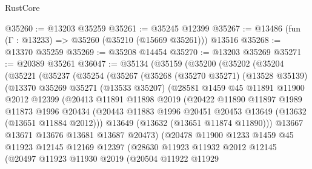 \begin{lexlean}{RustCore}
\begin{coremodule}
@35260 := @13203 @35259
@35261 := @35245 @12399
@35267 := @13486 (fun (Γ : @13233) => @35260 (@35210 (@15669 @35261))) @13516
@35268 := @13370 @35259
@35269 := @35208 @14454
@35270 := @13203 @35269
@35271 := @20389 @35261
@36047 := @35134
    (@35159
      (@35200
        (@35202
          (@35204
            (@35221
              (@35237
                (@35254
                  (@35267
                    (@35268
                      (@35270 @35271)
                      (@13528 @35139)
                      (@13370
                        @35269
                        @35271
                        (@13533 @35207)
                        (@28581
                          @1459
                          @45
                          @11891
                          @11900
                          @2012
                          @12399
                          (@20413
                            @11891
                            @11898
                            @2019
                            (@20422
                              @11890
                              @11897
                              @1989
                              @11873
                              @1996
                              @20434
                              (@20443
                                @11883
                                @1996
                                @20451
                                @20453
                                @13649
                                (@13632 (@13651 @11884 @2012)))
                              @13649
                              (@13632 (@13651 @11874 @11890)))
                            @13667
                            @13671
                            @13676
                            @13681
                            @13687
                            @20473)
                          (@20478
                            @11900
                            @1233
                            @1459
                            @45
                            @11923
                            @12145
                            @12169
                            @12397
                            (@28630
                              @11923
                              @11932
                              @2012
                              @12145
                              (@20497
                                @11923
                                @11930
                                @2019
                                (@20504
                                  @11922
                                  @11929

\end{coremodule}
\end{lexlean}
